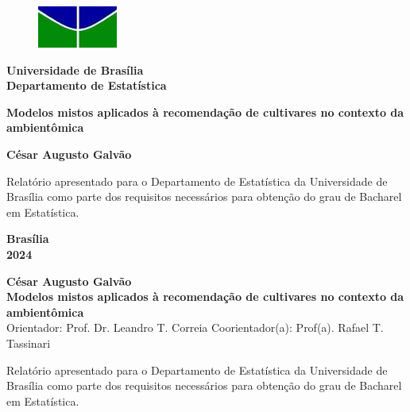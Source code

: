 \documentclass[12pt, a4paper, twoside]{report}
\numberwithin{equation}{subsection} %
\newcommand{\titulo}{Modelos mistos aplicados à recomendação de cultivares no contexto da ambientômica}
\newcommand{\autor}{César Augusto Galvão}
\newcommand{\orientador}{ Prof. Dr. Leandro T. Correia}
\newcommand{\coorientador}{ Prof(a). Rafael T. Tassinari}
\begin{document}
\begin{titlepage}
\begin{center}
\begin{figure}[h!]
	\centering
		\includegraphics[scale = 0.8]{unb.png}
	\label{fig:unb}
\end{figure}
{\bf Universidade de Brasília \\
\bf Departamento de Estatística}
\vspace{5cm}

\setcounter{page}{0}
\null
\textbf{\titulo}
\vspace{2.5cm}


\vspace{0.2cm}
\textbf{\autor}
\end{center}
\vspace{1.5cm}

\begin{flushright}
\begin{minipage}{7.5cm}
\parbox[t]{7.5cm}{Relatório apresentado para o Departamento de Estatística da Universidade de Brasília como parte dos requisitos necessários para obtenção do grau de Bacharel em Estatística.}
\end{minipage}
\end{flushright}

\vspace{5cm}

\begin{center}
{\bf{Brasília} \\ }
\bf{2024}
\end{center}

\end{titlepage}

\thispagestyle{empty}

\begin{center}
\textbf{\autor} \\
\vspace{5cm}
\textbf{\titulo} \\
\vspace{3cm}
\small
Orientador: \orientador
Coorientador(a): \coorientador
\end{center}


\vspace*{3cm}

\begin{flushright}
\begin{minipage}{7.5cm}
 \parbox[t]{7.5cm}{Relatório apresentado para o Departamento de Estatística da Universidade de Brasília como parte dos requisitos necessários para obtenção do grau de Bacharel em Estatística.}
\end{minipage}
\end{flushright}
\end{document}
